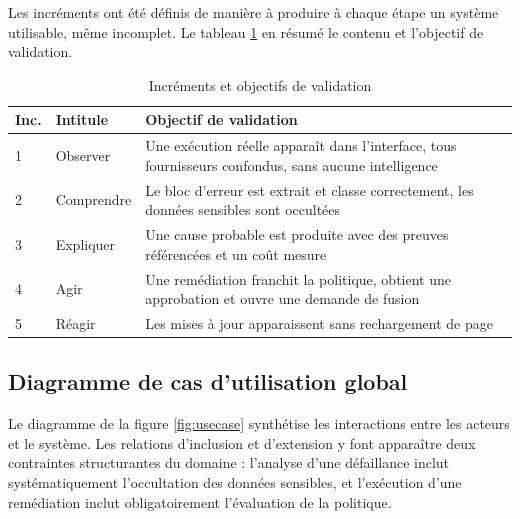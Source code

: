\documentclass[12pt,a4paper,oneside]{report}
\begin{document}
Les incréments ont été définis de manière à produire à chaque étape un système
utilisable, même incomplet. Le tableau \ref{tab:releases} en résumé le contenu et
l'objectif de validation.

\begin{table}[htbp]
\centering
\caption{Incréments et objectifs de validation}
\label{tab:releases}
\small
\begin{tabularx}{\textwidth}{@{}llX@{}}
\toprule
\textbf{Inc.} & \textbf{Intitule} & \textbf{Objectif de validation} \\
\midrule
1 & Observer & Une exécution réelle apparaît dans l'interface, tous fournisseurs confondus, sans aucune intelligence \\
2 & Comprendre & Le bloc d'erreur est extrait et classe correctement, les données sensibles sont occultées \\
3 & Expliquer & Une cause probable est produite avec des preuves référencées et un coût mesure \\
4 & Agir & Une remédiation franchit la politique, obtient une approbation et ouvre une demande de fusion \\
5 & Réagir & Les mises à jour apparaissent sans rechargement de page \\
\bottomrule
\end{tabularx}
\end{table}

\subsection{Diagramme de cas d'utilisation global}

Le diagramme de la figure \ref{fig:usecase} synthétise les interactions entre les
acteurs et le système. Les relations d'inclusion et d'extension y font apparaître
deux contraintes structurantes du domaine : l'analyse d'une défaillance inclut
systématiquement l'occultation des données sensibles, et l'exécution d'une
remédiation inclut obligatoirement l'évaluation de la politique.
\end{document}
